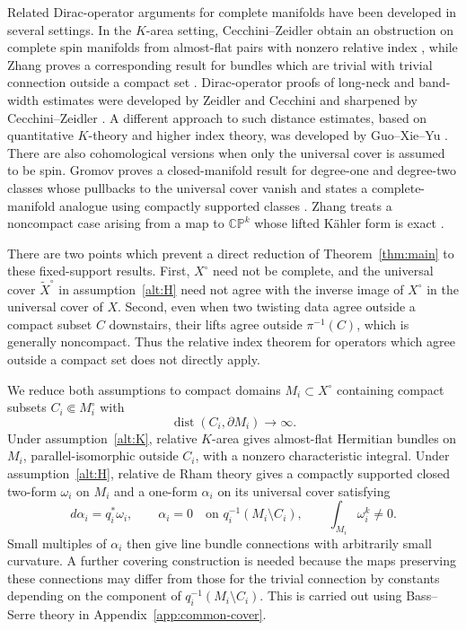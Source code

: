 \documentclass[12pt,reqno]{amsart}
\numberwithin{equation}{section}
\theoremstyle{definition}
\newcommand{\dist}{\operatorname{dist}}
\begin{document}
Related Dirac-operator arguments for complete manifolds have been
developed in several settings.
In the $K$-area setting, Cecchini--Zeidler obtain an obstruction on complete
spin manifolds from almost-flat pairs with nonzero relative index
\cite[Corollary~3.10]{CecchiniZeidlerCallias}, while Zhang proves a
corresponding result for bundles which are trivial with trivial
connection outside a compact set
\cite[Theorem~2.3]{ZhangDeformedDirac}. 
Dirac-operator proofs of
long-neck and band-width estimates were developed by Zeidler and
Cecchini \cite{ZeidlerBandWidth,CecchiniLongNeck} and sharpened by
Cecchini--Zeidler \cite{CecchiniZeidlerComparison}.  A different
approach to such distance estimates, based on quantitative $K$-theory
and higher index theory, was developed by Guo--Xie--Yu
\cite{GuoXieYuQuantitative}.
There are also cohomological versions when only the universal cover is assumed to
be spin.  Gromov proves a closed-manifold result for degree-one and
degree-two classes whose pullbacks to the universal cover vanish and
states a complete-manifold analogue using compactly supported classes
\cite[\S10]{GromovMetricInequalities}.  Zhang treats a
noncompact case arising from a map to $\mathbb{CP}^k$ whose lifted
K\"ahler form is exact
\cite[\S2.2]{ZhangDeformedDirac}.

There are two points which prevent a direct reduction of
Theorem~\ref{thm:main} to these fixed-support results.  First,
$X^\circ$ need not be complete, and the universal cover
$\widetilde X^\circ$ in assumption~\ref{alt:H} need not agree with
the inverse image of $X^\circ$ in the universal cover of $X$.
Second, even when two twisting data agree outside a compact subset
$C$ downstairs, their lifts agree outside $\pi^{-1}(C)$, which is
generally noncompact.  Thus the relative index theorem for operators
which agree outside a compact set
\cite{GromovLawsonComplete} does not directly apply.

We reduce both assumptions to compact domains
$M_i\subset X^\circ$ containing compact subsets
$C_i\Subset M_i^\circ$ with
\[
 \dist(C_i,\partial M_i)\longrightarrow\infty.
\]
Under assumption~\ref{alt:K}, relative $K$-area gives almost-flat
Hermitian bundles on $M_i$, parallel-isomorphic outside $C_i$, with
a nonzero characteristic integral.  Under
assumption~\ref{alt:H}, relative de Rham theory gives a compactly
supported closed two-form $\omega_i$ on $M_i$ and a one-form
$\alpha_i$ on its universal cover satisfying
\[
 d\alpha_i=q_i^*\omega_i,\qquad
 \alpha_i=0\quad\text{on }q_i^{-1}(M_i\setminus C_i),\qquad
 \int_{M_i}\omega_i^k\ne0.
\]
Small multiples of $\alpha_i$ then give line bundle connections with
arbitrarily small curvature.  A further covering construction is
needed because the maps preserving these connections may differ from
those for the trivial connection by constants depending on the
component of $q_i^{-1}(M_i\setminus C_i)$. This is carried out using Bass--Serre theory in Appendix~\ref{app:common-cover}.
\end{document}
